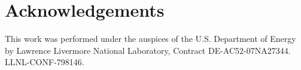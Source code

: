 \section*{Acknowledgements}

This work was performed under the auspices of the U.S. Department of
Energy by Lawrence Livermore National Laboratory, Contract
DE-AC52-07NA27344.  LLNL-CONF-798146.
